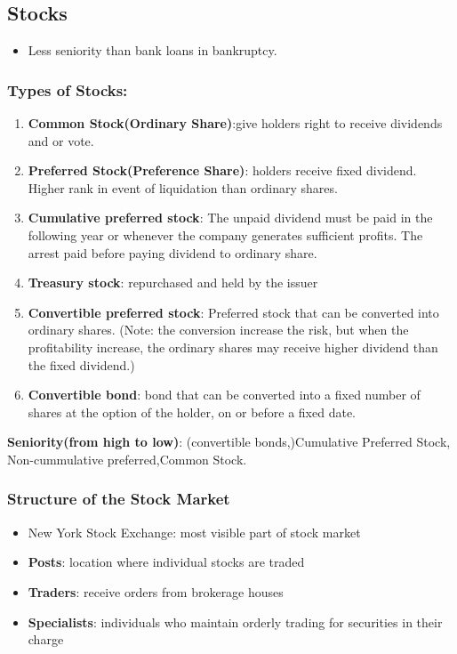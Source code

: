 \documentclass{article}
\theoremstyle{definition}
\theoremstyle{thrm}
\theoremstyle{lma}
\theoremstyle{ppst}
\theoremstyle{crlr}
\begin{document}
\subsection{Stocks}
\begin{itemize}
	\item Less seniority than bank loans in bankruptcy.
\end{itemize}
\subsubsection{Types of Stocks:}
\begin{enumerate}
	\item \textbf{Common Stock(Ordinary Share)}:give holders right to receive dividends and or vote.
	\item \textbf{Preferred Stock(Preference Share)}: holders receive fixed dividend. Higher rank in event of liquidation than ordinary shares.
	\item \textbf{Cumulative preferred stock}: The unpaid dividend must be paid in the following year or whenever the company generates sufficient profits. The arrest paid before paying dividend to ordinary share.
	\item \textbf{Treasury stock}: repurchased and held by the issuer
	\item \textbf{Convertible preferred stock}: Preferred stock that can be converted into ordinary shares. (Note: the conversion increase the risk, but when the profitability increase, the ordinary shares may receive higher dividend than the fixed dividend.)
	\item \textbf{Convertible bond}: bond that can be converted into a fixed number of shares at the option of the holder, on or before a fixed date. 
\end{enumerate}
\textbf{Seniority(from high to low)}: (convertible bonds,)Cumulative Preferred Stock, Non-cummulative preferred,Common Stock.
\subsubsection{Structure of the Stock Market}
\begin{itemize}
	\item New York Stock Exchange: most visible part of stock market
	\item \textbf{Posts}: location where individual stocks are traded
	\item \textbf{Traders}: receive orders from brokerage houses
	\item \textbf{Specialists}: individuals who maintain orderly trading for securities in their charge
\end{itemize}
\end{document}
